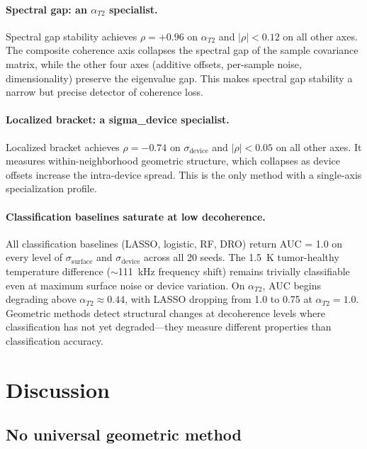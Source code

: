 \documentclass[11pt]{article}
\begin{document}
\paragraph{Spectral gap: an $\alpha_{T2}$ specialist.}
Spectral gap stability achieves $\rho = +0.96$ on $\alpha_{T2}$ and
$|\rho| < 0.12$ on all other axes.  The composite coherence axis
collapses the spectral gap of the sample covariance matrix, while
the other four axes (additive offsets, per-sample noise, dimensionality)
preserve the eigenvalue gap.  This makes spectral gap stability a
narrow but precise detector of coherence loss.

\paragraph{Localized bracket: a sigma\_device specialist.}
Localized bracket achieves $\rho = -0.74$ on $\sigma_\text{device}$
and $|\rho| < 0.05$ on all other axes.  It measures within-neighborhood
geometric structure, which collapses as device offsets increase the
intra-device spread.  This is the only method with a single-axis
specialization profile.

\paragraph{Classification baselines saturate at low decoherence.}
All classification baselines (LASSO, logistic, RF, DRO) return AUC =
1.0 on every level of $\sigma_\text{surface}$ and
$\sigma_\text{device}$ across all 20 seeds.  The 1.5~K tumor-healthy
temperature difference ($\sim$111~kHz frequency shift) remains
trivially classifiable even at maximum surface noise or device
variation.  On $\alpha_{T2}$, AUC begins degrading above
$\alpha_{T2} \approx 0.44$, with LASSO dropping from 1.0 to 0.75 at
$\alpha_{T2} = 1.0$.  Geometric methods detect structural changes at
decoherence levels where classification has not yet degraded---they
measure different properties than classification accuracy.

\section{Discussion}
\label{sec:discussion}

\subsection{No universal geometric method}
\end{document}
